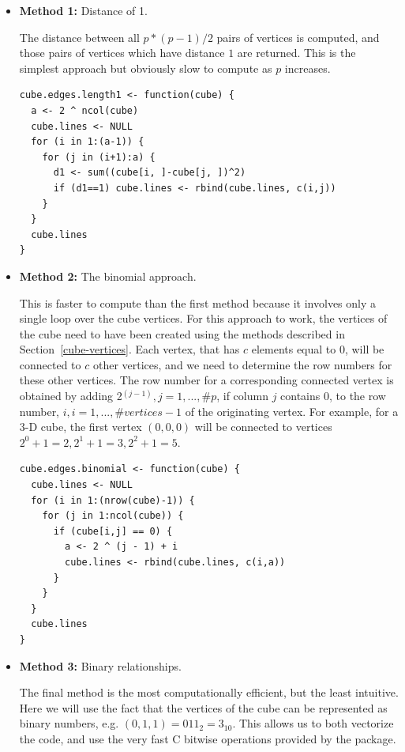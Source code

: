 \documentclass[article]{jss}
\begin{document}
\begin{itemize}

  \item {\bf Method 1:} Distance of 1.
  
    The distance between all $p * (p - 1) / 2$ pairs of vertices is
    computed, and those pairs of vertices which have distance $1$ are
    returned. This is the simplest approach but obviously slow to
    compute as $p$ increases.

\begin{verbatim}
cube.edges.length1 <- function(cube) {
  a <- 2 ^ ncol(cube)
  cube.lines <- NULL
  for (i in 1:(a-1)) {
    for (j in (i+1):a) {
      d1 <- sum((cube[i, ]-cube[j, ])^2)
      if (d1==1) cube.lines <- rbind(cube.lines, c(i,j))
    }     
  }
  cube.lines
}
\end{verbatim}

  \item {\bf Method 2:} The binomial approach.
  
    This is faster to compute than the first method because it
    involves only a single loop over the cube vertices. For this
    approach to work, the vertices of the cube need to have been
    created using the methods described in
    Section~\ref{cube-vertices}. Each vertex, that has $c$ elements
    equal to 0, will be connected to $c$ other vertices, and we need
    to determine the row numbers for these other vertices. The row
    number for a corresponding connected vertex is obtained by adding
    2$^{(j-1)}, j=1,...,\#p$, if column $j$ contains 0, to the row
    number, $i, i=1,...,\#vertices-1$ of the originating vertex. For
    example, for a 3-D cube, the first vertex $(0,0,0)$ will be
    connected to vertices $2^0+1=2, 2^1+1=3, 2^2+1=5$.

\begin{verbatim}
cube.edges.binomial <- function(cube) {
  cube.lines <- NULL
  for (i in 1:(nrow(cube)-1)) {
    for (j in 1:ncol(cube)) {
      if (cube[i,j] == 0) {
        a <- 2 ^ (j - 1) + i
        cube.lines <- rbind(cube.lines, c(i,a))
      }
    }
  }
  cube.lines
}
\end{verbatim}

  \item {\bf Method 3:} Binary relationships.
  
    The final method is the most computationally efficient, but the
    least intuitive. Here we will use the fact that the vertices of
    the cube can be represented as binary numbers, e.g.  $(0, 1, 1) =
    011_2 = 3_{10}$. This allows us to both vectorize the code, and
    use the very fast C bitwise operations provided by the
     package.


\end{itemize}
\end{document}
